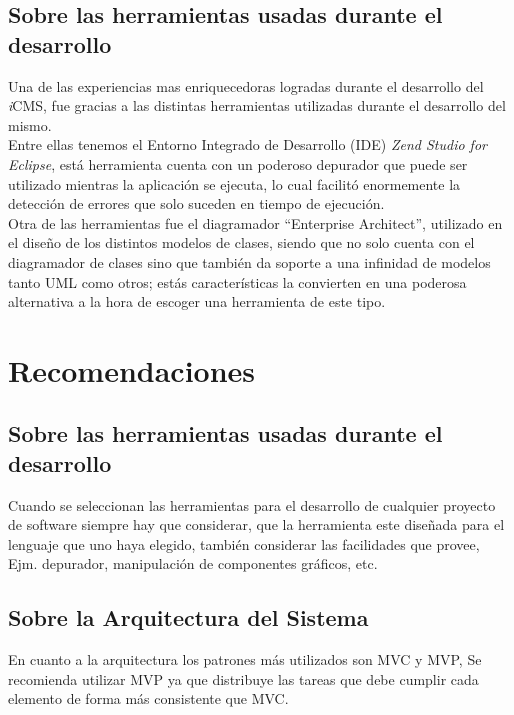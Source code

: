 \subsection{Sobre las herramientas usadas durante el desarrollo}
Una de las experiencias mas enriquecedoras logradas durante el desarrollo del \textit{i}CMS, fue gracias a las distintas herramientas utilizadas durante el desarrollo del mismo.\\ Entre ellas tenemos el Entorno Integrado de Desarrollo (IDE) \emph{Zend Studio for Eclipse}, est\'a herramienta cuenta con un poderoso depurador que puede ser utilizado mientras la aplicaci\'on se ejecuta, lo cual facilit\'o enormemente la detecci\'on de errores que solo suceden en tiempo de ejecuci\'on.\\
Otra de las herramientas fue el diagramador ``Enterprise Architect'', utilizado en el dise\~no de los distintos modelos de clases, siendo que no solo cuenta con el diagramador de clases sino que tambi\'en da soporte a una infinidad de modelos tanto UML como otros; est\'as caracter\'isticas la convierten en una poderosa alternativa a la hora de escoger una herramienta de este tipo.

\section{Recomendaciones}

\subsection{Sobre las herramientas usadas durante el desarrollo}
Cuando se seleccionan las herramientas para el desarrollo de cualquier proyecto de software siempre hay que considerar, que la herramienta este dise\~nada para el lenguaje que uno haya elegido, tambi\'en considerar las facilidades que provee, Ejm. depurador, manipulaci\'on de componentes gr\'aficos, etc.

\subsection{Sobre la Arquitectura del Sistema}
En cuanto a la arquitectura los patrones m\'as utilizados son MVC y MVP, Se recomienda utilizar MVP ya que distribuye las tareas que debe cumplir cada elemento de forma m\'as consistente que MVC.

